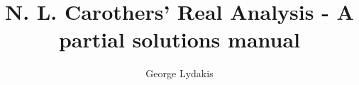 \documentclass[a4paper, 11pt]{book}
\begin{document}
\title{N. L. Carothers' Real Analysis - A partial solutions manual}
\author{George Lydakis}
\maketitle

\setcounter{tocdepth}{2}
\tableofcontents


%
%









\end{document}
